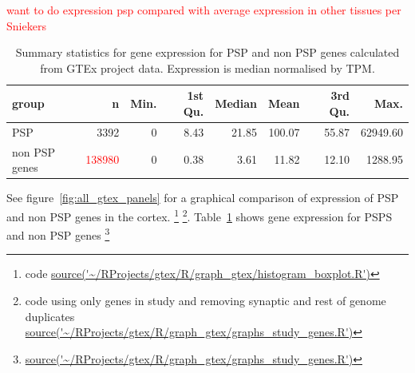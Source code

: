  \textcolor{red}{want to do expression psp compared with average expression in other tissues per Sniekers}

\begin{table}[ht]
\centering
\begin{tabular}{lrrrrrrr}
  \hline
group & n & Min. & 1st Qu. & Median & Mean & 3rd Qu. & Max. \\ 
  \hline
PSP & 3392 & 0 & 8.43 & 21.85 & 100.07 & 55.87 & 62949.60 \\ 
  non PSP genes & \textcolor{red}{138980} & 0 & 0.38 & 3.61 & 11.82 & 12.10 & 1288.95 \\ 
   \hline
\end{tabular}
\caption{Summary statistics for gene expression for PSP and non PSP genes calculated from GTEx project data. Expression is median normalised by TPM.}
\label{tab:Summary statistics for gene expression for PSP and non PSP genes}
\end{table}


    See figure~\ref{fig:all_gtex_panels} for a graphical comparison of expression of PSP and non PSP genes in the cortex. \footnote{code \url{source('~/RProjects/gtex/R/graph_gtex/histogram_boxplot.R')} } \footnote{code using only genes in study and removing synaptic and rest of genome duplicates \url{source('~/RProjects/gtex/R/graph_gtex/graphs_study_genes.R')} }. Table~\ref{tab:Summary statistics for gene expression for PSP and non PSP genes} shows gene expression for PSPS and non PSP genes \footnote{\url{source('~/RProjects/gtex/R/graph_gtex/graphs_study_genes.R')}}
    
    
